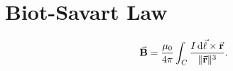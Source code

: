 \part{Biot-Savart Law}
\[
	\va{B} = \frac{\mu_0}{4\pi}\int_{C}\frac{I \dd{\va{\ell}}\times \va{r} }{ \| \va{r} \| ^3}
	.\]
